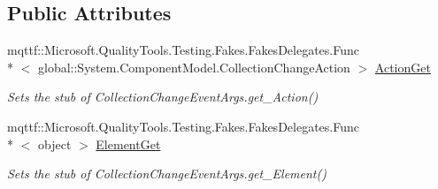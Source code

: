 \subsection*{Public Attributes}
\begin{DoxyCompactItemize}
\item 
mqttf\-::\-Microsoft.\-Quality\-Tools.\-Testing.\-Fakes.\-Fakes\-Delegates.\-Func\\*
$<$ global\-::\-System.\-Component\-Model.\-Collection\-Change\-Action $>$ \hyperlink{class_system_1_1_component_model_1_1_fakes_1_1_stub_collection_change_event_args_a82b062f32ed25c3a4bc95ece9f53f28c}{Action\-Get}
\begin{DoxyCompactList}\small\item\em Sets the stub of Collection\-Change\-Event\-Args.\-get\-\_\-\-Action()\end{DoxyCompactList}\item 
mqttf\-::\-Microsoft.\-Quality\-Tools.\-Testing.\-Fakes.\-Fakes\-Delegates.\-Func\\*
$<$ object $>$ \hyperlink{class_system_1_1_component_model_1_1_fakes_1_1_stub_collection_change_event_args_a91388658bdb1d36f3c1ac7d155ebbd44}{Element\-Get}
\begin{DoxyCompactList}\small\item\em Sets the stub of Collection\-Change\-Event\-Args.\-get\-\_\-\-Element()\end{DoxyCompactList}\end{DoxyCompactItemize}
